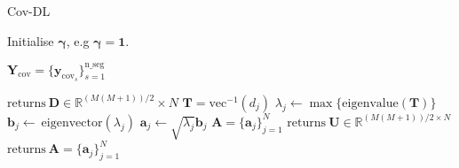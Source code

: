 \begin{algorithm}[H]
\caption{Cov-DL}
\begin{algorithmic}[1]
\State Initialise $\boldsymbol{\gamma}$, e.g $\boldsymbol{\gamma} = \mathbf{1}$.
\EndWhile
		
			\State$\textbf{Y}_{\text{cov}} = \{\textbf{y}_{\text{cov}_s}\}_{s=1}^{\text{n\_seg}}$
			
			\State$\text{returns} \ \textbf{D} \in \mathbb{R}^{(M(M+1))/2}\times N$
			\EndProcedure
			\State$\textbf{T} = \text{vec}^{-1}(d_j)$            
			\State$\lambda_j\gets \max\{\text{eigenvalue}(\textbf{T})\}$
			\State$\textbf{b}_j \gets \ \text{eigenvector}(\lambda_j)$
			\State$\textbf{a}_j \gets \sqrt{\lambda_j}\textbf{b}_j$
			\EndFor
			\State$\textbf{A} = \{\textbf{a}_j\}_{j=1}^N$
			\EndIf
			\State
				\State$\text{returns} \ \textbf{U}\in \mathbb{R}^{(M(M+1))/2\times N}$
				\EndProcedure
				\State$\text{returns}\ \textbf{A}= \{\textbf{a}_j\}_{j=1}^{N}$
				\EndProcedure
			\EndIf
           \EndProcedure
        \end{algorithmic} 
        \label{alg:Cov1}
\end{algorithm}